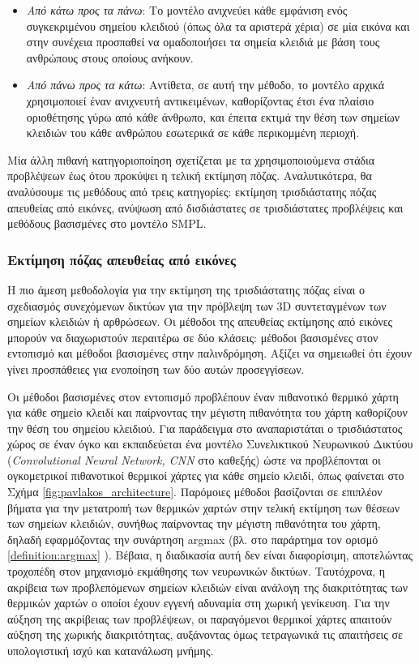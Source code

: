 \begin{itemize}
    \item \textsl{Aπό κάτω προς τα πάνω}: Το μοντέλο ανιχνεύει κάθε εμφάνιση ενός συγκεκριμένου σημείου κλειδιού (όπως όλα τα αριστερά χέρια) σε μία εικόνα και στην συνέχεια προσπαθεί να ομαδοποιήσει τα σημεία κλειδιά με βάση τους ανθρώπους στους οποίους ανήκουν. 
    \item \textsl{Aπό πάνω προς τα κάτω}: Αντίθετα, σε αυτή την μέθοδο, το μοντέλο αρχικά χρησιμοποιεί έναν ανιχνευτή αντικειμένων, καθορίζοντας έτσι ένα πλαίσιο οριοθέτησης γύρω από κάθε άνθρωπο, και έπειτα εκτιμά την θέση των σημείων κλειδιών του κάθε ανθρώπου εσωτερικά σε κάθε περικομμένη περιοχή.
\end{itemize}

Μία άλλη πιθανή κατηγοριοποίηση σχετίζεται με τα χρησιμοποιούμενα στάδια προβλέψεων έως ότου προκύψει η τελική εκτίμηση πόζας. Αναλυτικότερα, θα αναλύσουμε τις μεθόδους από τρεις κατηγορίες: εκτίμηση τρισδιάστατης πόζας απευθείας από εικόνες, ανύψωση από δισδιάστατες σε τρισδιάστατες προβλέψεις και μεθόδους βασισμένες στο μοντέλο SMPL. 

\subsubsection{Εκτίμηση πόζας απευθείας από εικόνες}

Η πιο άμεση μεθοδολογία για την εκτίμηση της τρισδιάστατης πόζας είναι ο σχεδιασμός συνεχόμενων δικτύων για την πρόβλεψη των 3D συντεταγμένων των σημείων κλειδιών ή αρθρώσεων. Οι μέθοδοι της απευθείας εκτίμησης από εικόνες μπορούν να διαχωριστούν περαιτέρω σε δύο κλάσεις: μέθοδοι βασισμένες στον εντοπισμό και μέθοδοι βασισμένες στην παλινδρόμηση. Αξίζει να σημειωθεί ότι έχουν γίνει προσπάθειες για ενοποίηση των δύο αυτών προσεγγίσεων.

Οι μέθοδοι βασισμένες στον εντοπισμό προβλέπουν έναν πιθανοτικό θερμικό χάρτη για κάθε σημείο κλειδί και παίρνοντας την μέγιστη πιθανότητα του χάρτη καθορίζουν την θέση του σημείου κλειδιού. Για παράδειγμα στο \cite{pavlakos_paper} αναπαριστάται ο τρισδιάστατος χώρος σε έναν όγκο και εκπαιδεύεται ένα μοντέλο Συνελικτικού Νευρωνικού Δικτύου (\textsl{Convolutional Neural Network, CNN} στο καθεξής) ώστε να προβλέπονται οι ογκομετρικοί πιθανοτικοί θερμικοί χάρτες για κάθε σημείο κλειδί, όπως φαίνεται στο Σχήμα \ref{fig:pavlakos_architecture}. Παρόμοιες μέθοδοι βασίζονται σε επιπλέον βήματα για την μετατροπή των θερμικών χαρτών στην τελική εκτίμηση των θέσεων των σημείων κλειδιών, συνήθως παίρνοντας την μέγιστη πιθανότητα του χάρτη, δηλαδή εφαρμόζοντας την συνάρτηση argmax (βλ. στο παράρτημα τον ορισμό \ref{definition:argmax} ). Βέβαια, η διαδικασία αυτή δεν είναι διαφορίσιμη, αποτελώντας τροχοπέδη στον μηχανισμό εκμάθησης των νευρωνικών δικτύων. Ταυτόχρονα, η ακρίβεια των προβλεπόμενων σημείων κλειδιών είναι ανάλογη της διακριτότητας των θερμικών χαρτών ο οποίοι έχουν εγγενή αδυναμία στη χωρική γενίκευση. Για την αύξηση της ακρίβειας των προβλέψεων, οι παραγόμενοι θερμικοί χάρτες απαιτούν αύξηση της χωρικής διακριτότητας, αυξάνοντας όμως τετραγωνικά τις απαιτήσεις σε υπολογιστική ισχύ και κατανάλωση μνήμης.

